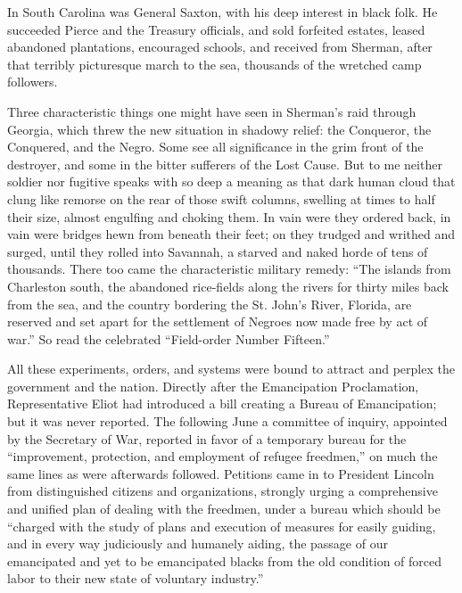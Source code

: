 In South Carolina was General Saxton, with his deep interest in black folk. He succeeded Pierce and the Treasury officials, and sold forfeited estates, leased abandoned plantations, encouraged schools, and received from Sherman, after that terribly picturesque march to the sea, thousands of the wretched camp followers.\par

Three characteristic things one might have seen in Sherman’s raid through Georgia, which threw the new situation in shadowy relief: the Conqueror, the Conquered, and the Negro. Some see all significance in the grim front of the destroyer, and some in the bitter sufferers of the Lost Cause. But to me neither soldier nor fugitive speaks with so deep a meaning as that dark human cloud that clung like remorse on the rear of those swift columns, swelling at times to half their size, almost engulfing and choking them. In vain were they ordered back, in vain were bridges hewn from beneath their feet; on they trudged and writhed and surged, until they rolled into Savannah, a starved and naked horde of tens of thousands. There too came the characteristic military remedy: “The islands from Charleston south, the abandoned rice-fields along the rivers for thirty miles back from the sea, and the country bordering the St. John’s River, Florida, are reserved and set apart for the settlement of Negroes now made free by act of war.” So read the celebrated “Field-order Number Fifteen.”\par

All these experiments, orders, and systems were bound to attract and perplex the government and the nation. Directly after the Emancipation Proclamation, Representative Eliot had introduced a bill creating a Bureau of Emancipation; but it was never reported. The following June a committee of inquiry, appointed by the Secretary of War, reported in favor of a temporary bureau for the “improvement, protection, and employment of refugee freedmen,” on much the same lines as were afterwards followed. Petitions came in to President Lincoln from distinguished citizens and organizations, strongly urging a comprehensive and unified plan of dealing with the freedmen, under a bureau which should be “charged with the study of plans and execution of measures for easily guiding, and in every way judiciously and humanely aiding, the passage of our emancipated and yet to be emancipated blacks from the old condition of forced labor to their new state of voluntary industry.”\par

